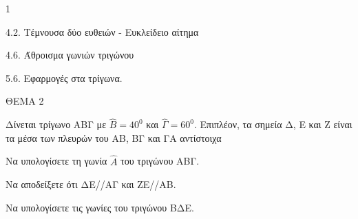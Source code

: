 \begin{ylh}{1}
    \item 4.2. Τέμνουσα δύο ευθειών - Ευκλείδειο αίτημα
    \item 4.6. Άθροισμα γωνιών τριγώνου
    \item 5.6. Εφαρμογές στα τρίγωνα.
\end{ylh}

ΘΕΜΑ 2

Δίνεται τρίγωνο ΑΒΓ με $\widehat{Β} = 40^{0}$ και $\widehat{\Gamma} = 60^{0}$. Επιπλέον, τα σημεία Δ, Ε και Ζ είναι τα μέσα των πλευρών του ΑΒ, ΒΓ και ΓΑ αντίστοιχα

\begin{alist}
\item Να υπολογίσετε τη γωνία $\widehat{Α}$ του τριγώνου ΑΒΓ. 

\item Να αποδείξετε ότι ΔΕ//ΑΓ και ΖΕ//ΑΒ. 

\item Να υπολογίσετε τις γωνίες του τριγώνου ΒΔΕ. 


\begin{center}
\end{center}
\end{alist}
